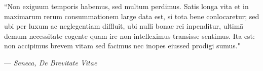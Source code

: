 \vspace*{\fill}
\begin{changemargin}{1in}{1in}
	\begin{center}
		\thispagestyle{empty}
		\addtolength{\textwidth}{-10.75in}
		``Non exiguum temporis habemus, sed multum perdimus. Satis longa vita et in maximarum rerum consummationem large data est, si tota bene conlocaretur; sed ubi per luxum ac neglegentiam diffluit, ubi nulli bonae rei inpenditur, ultimā demum necessitate cogente quam ire non intelleximus transisse sentimus. Ita est: non accipimus brevem vitam sed facimus nec inopes eiussed prodigi sumus."
		\begin{flushright}
			--- \textit{Seneca, De Brevitate Vitae}
		\end{flushright}
	\end{center}
\end{changemargin}
\vspace*{\fill}